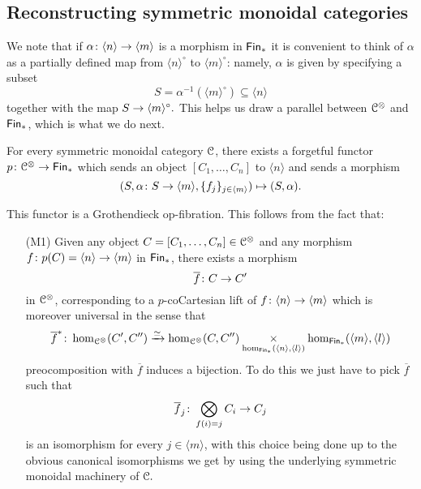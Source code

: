 \subsection{Reconstructing symmetric monoidal categories}
\begin{remark}
    We note that if $\alpha\colon \langle n\rangle \rightarrow \langle m\rangle$ is a morphism in $\operatorname{\sf Fin}_\ast$ it is convenient to think of $\alpha$ as a partially defined map from $\langle n \rangle^{\circ}$ to $\langle m \rangle^{\circ}$: namely, $\alpha$ is given by specifying a subset $$S=\alpha^{-1}(\langle m \rangle^{\circ})\subseteq \langle n \rangle$$ together with the map $S \rightarrow \langle m \rangle^{\circ}.$ This helps us draw a parallel between $\mathcal C^{\otimes}$ and $\operatorname{\sf Fin}_\ast$, which is what we do next.
\end{remark}
\begin{construction}
    For every symmetric monoidal category $\mathcal C$, there exists a forgetful functor $p\colon \mathcal C^{\otimes} \rightarrow \operatorname{\sf Fin}_{\ast}$ which sends an object $[C_1,\ldots,C_n]$ to $\langle n \rangle$ and sends a morphism \[(S,\alpha\colon S \rightarrow \langle m \rangle, \{f_j\}_{j\in\langle m \rangle}) \mapsto (S,\alpha).\]

    This functor is a Grothendieck op-fibration. This follows from the fact that:
    \begin{enumerate}
    \item[(M1)]\label{monoidal char1} Given any object $C=[C_1,\ldots,C_n]\in\mathcal C^{\otimes}$ and any morphism $f\colon p(C) = \langle n \rangle  \rightarrow \langle m \rangle$ in $\operatorname{\sf Fin}_\ast$, there exists a morphism \[\overline{f}\colon C \rightarrow C'\] in $\mathcal C^{\otimes}$, corresponding to a $p$-coCartesian lift of $f\colon \langle n \rangle \rightarrow \langle m \rangle$ which is moreover universal in the sense that \[\overline{f}^{\ast} \colon \hom_{\mathcal C^{\otimes}}(C',C'') \xrightarrow{\simeq} \hom_{\mathcal C^{\otimes}}(C,C'') \underset{\hom_{\operatorname{\sf Fin}_{\ast}}(\langle n\rangle,\langle l \rangle)}{\times} \hom_{\operatorname{\sf Fin}_{\ast}}(\langle m \rangle,\langle l \rangle)\] preocomposition with $\overline{f}$ induces a bijection. To do this we just have to pick $\overline{f}$ such that $$\overline{f}_{j}\colon \bigotimes _{f(i)=j}C_i \rightarrow C_j$$ is an isomorphism for every $j\in \langle m \rangle$, with this choice being done up to the obvious canonical isomorphisms we get by using the underlying symmetric monoidal machinery of $\mathcal C.$ 
    

\end{enumerate}
\end{construction}
